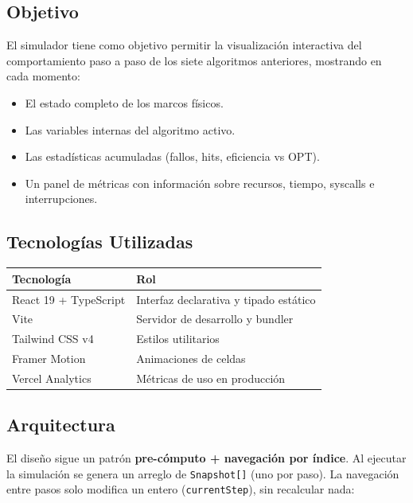 \documentclass[12pt, a4paper]{article}
\begin{document}
\subsection{Objetivo}

El simulador tiene como objetivo permitir la visualización interactiva del comportamiento paso a paso de los siete algoritmos anteriores, mostrando en cada momento:
\begin{itemize}
  \item El estado completo de los marcos físicos.
  \item Las variables internas del algoritmo activo.
  \item Las estadísticas acumuladas (fallos, hits, eficiencia vs OPT).
  \item Un panel de métricas con información sobre recursos, tiempo, syscalls e interrupciones.
\end{itemize}

\subsection{Tecnologías Utilizadas}

\begin{center}
\begin{tabular}{ll}
  \toprule
  Tecnología & Rol \\
  \midrule
  React 19 + TypeScript & Interfaz declarativa y tipado estático \\
  Vite & Servidor de desarrollo y bundler \\
  Tailwind CSS v4 & Estilos utilitarios \\
  Framer Motion & Animaciones de celdas \\
  Vercel Analytics & Métricas de uso en producción \\
  \bottomrule
\end{tabular}
\end{center}

\subsection{Arquitectura}

El diseño sigue un patrón \textbf{pre-cómputo + navegación por índice}. Al ejecutar la simulación se genera un arreglo de \texttt{Snapshot[]} (uno por paso). La navegación entre pasos solo modifica un entero (\texttt{currentStep}), sin recalcular nada:
\end{document}
